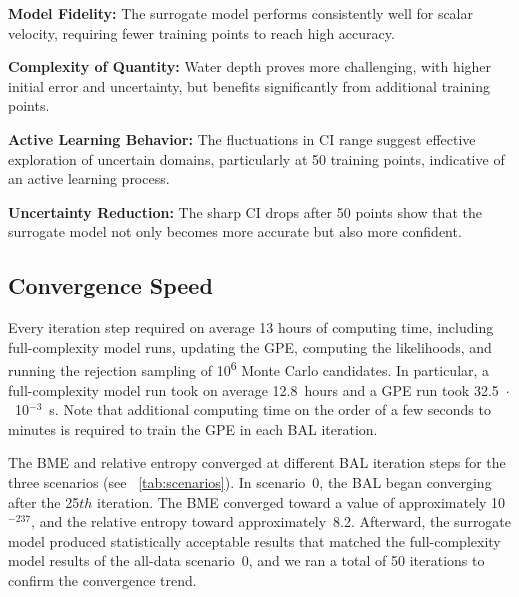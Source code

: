 \documentclass[draft,linenumbers,onecolumn]{agujournal2019} %
\begin{document}
\textbf{Model Fidelity:} The surrogate model performs consistently well for scalar velocity, requiring fewer training points to reach high accuracy.

\textbf{Complexity of Quantity:} Water depth proves more challenging, with higher initial error and uncertainty, but benefits significantly from additional training points.

\textbf{Active Learning Behavior:} The fluctuations in CI range suggest effective exploration of uncertain domains, particularly at 50 training points, indicative of an active learning process.

\textbf{Uncertainty Reduction:} The sharp CI drops after 50 points show that the surrogate model not only becomes more accurate but also more confident.
































\subsection{Convergence Speed}
Every iteration step required on average 13 hours of computing time, including full-complexity model runs, updating the GPE, computing the likelihoods, and running the rejection sampling of 10\textsuperscript{6} Monte Carlo candidates. In particular, a full-complexity model run took on average 12.8~hours and a GPE run took 32.5~$\cdot$~10$^{-3}$~s. Note that additional computing time on the order of a few seconds to minutes is required to train the GPE in each BAL iteration.

The BME and relative entropy converged at different BAL iteration steps for the three scenarios (see \tablename{~\ref{tab:scenarios}}). In scenario~0, the BAL began converging after the 25${th}$ iteration. The BME converged toward a value of approximately 10$^{-237}$, and the relative entropy toward approximately~8.2. Afterward, the surrogate model produced statistically acceptable results that matched the full-complexity model results of the all-data scenario~0, and we ran a total of 50 iterations to confirm the convergence trend.
\end{document}
